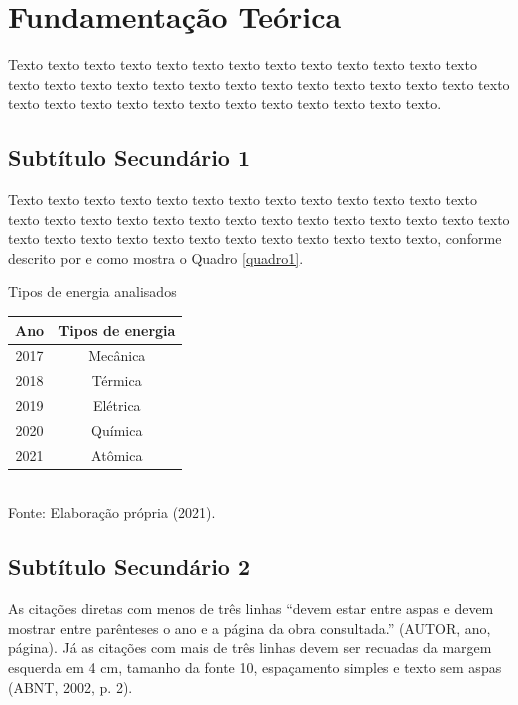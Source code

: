 \chapter{Fundamentação Teórica}

Texto texto texto texto texto texto texto texto texto texto texto texto texto texto texto texto texto texto texto texto texto texto texto texto texto texto texto texto texto texto texto texto texto texto texto texto texto texto texto.

\section{Subtítulo Secundário 1}

Texto texto texto texto texto texto texto texto texto texto texto texto texto texto texto texto texto texto texto texto texto texto texto texto texto texto texto texto texto texto texto texto texto texto texto texto texto texto texto, conforme descrito por \citet{pressman} e como mostra o Quadro \ref{quadro1}.


\begin{quadro}[h]
\centering

\caption{Tipos de energia analisados}
\begin{tabular}{|c|c|}
\hline
\textbf{Ano} & \textbf{Tipos de energia} \\ \hline
2017         & Mecânica                  \\ \hline
2018         & Térmica                   \\ \hline
2019         & Elétrica                  \\ \hline
2020         & Química                   \\ \hline
2021         & Atômica                   \\ \hline
\end{tabular}
\label{quadro1}
\\
\small{Fonte: Elaboração própria (2021).} 
\end{quadro}

\section{Subtítulo Secundário 2}

As citações diretas com menos de três linhas “devem estar entre aspas e devem mostrar entre parênteses o ano e a página da obra consultada.” (AUTOR, ano, página). Já as citações com mais de três linhas devem ser recuadas da margem esquerda em 4 cm, tamanho da fonte 10, espaçamento simples e texto sem aspas (ABNT, 2002, p. 2).



